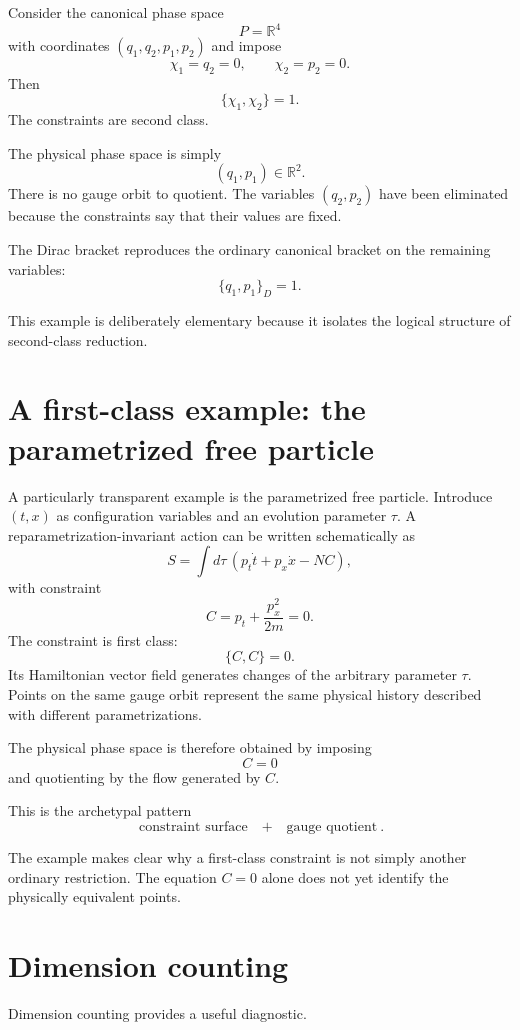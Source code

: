 \documentclass[11pt,a4paper]{article}
\newcommand{\R}{\mathbb R}
\theoremstyle{definition}
\begin{document}
Consider the canonical phase space
\[
        P=\R^4
\]
with coordinates $(q_1,q_2,p_1,p_2)$ and impose
\[
        \chi_1=q_2=0,
        \qquad
        \chi_2=p_2=0.
\]
Then
\[
        \{\chi_1,\chi_2\}=1.
\]
The constraints are second class.

The physical phase space is simply
\[
        (q_1,p_1)\in\R^2.
\]
There is no gauge orbit to quotient.  The variables $(q_2,p_2)$ have been
eliminated because the constraints say that their values are fixed.

The Dirac bracket reproduces the ordinary canonical bracket on the remaining
variables:
\[
        \{q_1,p_1\}_D=1.
\]

This example is deliberately elementary because it isolates the logical
structure of second-class reduction.

\section{A first-class example: the parametrized free particle}

A particularly transparent example is the parametrized free particle.
Introduce $(t,x)$ as configuration variables and an evolution parameter
$\tau$.  A reparametrization-invariant action can be written schematically as
\[
        S=\int d\tau\,
        \left(
        p_t\dot t+p_x\dot x
        -N C
        \right),
\]
with constraint
\[
        C=p_t+\frac{p_x^2}{2m}=0.
\]
The constraint is first class:
\[
        \{C,C\}=0.
\]
Its Hamiltonian vector field generates changes of the arbitrary parameter
$\tau$.  Points on the same gauge orbit represent the same physical history
described with different parametrizations.

The physical phase space is therefore obtained by imposing
\[
        C=0
\]
and quotienting by the flow generated by $C$.

This is the archetypal pattern
\[
        \boxed{
        \text{constraint surface}
        \quad+\quad
        \text{gauge quotient}
        }.
\]

The example makes clear why a first-class constraint is not simply another
ordinary restriction.  The equation $C=0$ alone does not yet identify the
physically equivalent points.

\section{Dimension counting}

Dimension counting provides a useful diagnostic.
\end{document}
